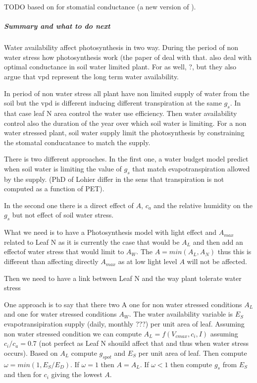 \documentclass[a4paper,11pt]{article}
\begin{document}
TODO \citet{Zavala-2005} based on \citet{leuning-1995} for stomatial
conductance (a new version of \citet{Collatz-1991}).

\subparagraph{Summary and what to do next}

Water availability affect photosynthesis in two way. During the period
of non water stress how photosynthesis work (the paper of
\citet{Wright-2003} deal with that. \citet{Medlyn-2011a} also deal
with optimal conductance in soil water limited plant.  For
\citet{Prentice-2014} as well, ?, but they also argue that vpd
represent the long term water availability.

In period of non water stress all plant have non limited supply of
water from the soil but the vpd is different inducing different
transpiration at the same $g_s$. In that case leaf N area control the
water use efficiency. Then water availability control also
the duration of the year over which soil water is limiting. For a non water
stressed plant, soil water supply limit the photosynthesis by
constraining the stomatal conducatance to match the supply.



There is two different approaches. In the first one, a water budget model
predict when soil water is limiting the value of $g_s$ that match
evapotranspiration allowed by the supply. (PhD of Lohier differ in the
sens that transpiration is not computed as a function of PET).

In the second one there is a direct effect of $A$, $c_a$ and the
relative humidity on the $g_s$ but not effect of soil water stress.

What we need is to have a Photosynthesis model with light effect and
$A_{max}$ related to Leaf N as it is currently the case that would be
$A_L$ and then add an effectof water stress that would limit to
$A_W$. The $A = min(A_L , A_N)$ thus this is different than affecting
directly $A_{max}$ as at low light level $A$ will not be affected.

Then we need to have a link between Leaf N and the way plant tolerate
water stress


One approach is to say that there two A one for non water stressed
conditions $A_L$ and one for water stressed conditions $A_W$. The
water availability variable is $E_S$ evapotransipiration supply
(daily, monthly ???) per unit area of leaf. Assuming non water
stressed condition we can
compute $A_L = f(V_{cmax}, c_i, I)$ assuming $c_i/c_a = 0.7$ (not
perfect as Leaf N shouild affect that and thus when water stress
occurs). Based on $A_L$ compute $g_{s pot}$ and $E_S$ per unit area of
leaf. Then compute $\omega = min(1, E_S/E_D)$. If $\omega = 1$ then $A
= A_L$. If $\omega < 1$ then compute $g_s$ from $E_S$ and then for
$c_i$ giving the lowest $A$.
\end{document}
